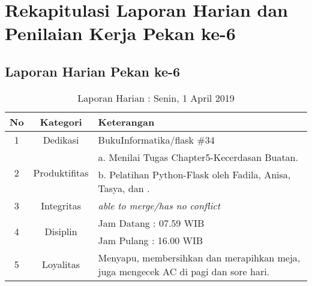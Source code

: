 \section{Rekapitulasi Laporan Harian dan Penilaian Kerja Pekan ke-6}

\subsection{Laporan Harian Pekan ke-6}

\begin{table}[htp]
\begin{center}
\caption{Laporan Harian : Senin, 1 April 2019}
\label{tab:lh010419}
\begin{tabularx}{\textwidth}{|l|l|X|}
\hline
\multicolumn{1}{|c|}{\textbf{No}} & \multicolumn{1}{c|}{\textbf{Kategori}} & \textbf{Keterangan} \\ \hline
\multicolumn{1}{|c|}{\multirow{1}{*}{1}} & \multicolumn{1}{c|}{\multirow{1}{*}{\parbox{2.5cm}{Dedikasi}}}
& BukuInformatika/flask \#34\\
\hline
\multicolumn{1}{|c|}{\multirow{2}{*}{2}} & \multicolumn{1}{c|}{\multirow{2}{*}{\parbox{2.5cm}{Produktifitas}}}
& a. Menilai Tugas Chapter5-Kecerdasan Buatan.\\
\multicolumn{1}{|c|}{\multirow{1}{*}{}} & \multicolumn{1}{c|}{\multirow{1}{*}{\parbox{2.5cm}{}}}
& b. Pelatihan Python-Flask oleh Fadila, Anisa, Tasya, dan .\\
\hline
\multicolumn{1}{|c|}{\multirow{1}{*}{3}} & \multicolumn{1}{c|}{\multirow{1}{*}{\parbox{2.5cm}{Integritas}}}
& \textit{able to merge/has no conflict} \\
\hline
\multicolumn{1}{|c|}{\multirow{2}{*}{4}} & \multicolumn{1}{c|}{\multirow{2}{*}{\parbox{2.5cm}{Disiplin}}}
& Jam Datang : 07.59 WIB \\
\multicolumn{1}{|c|}{\multirow{1}{*}{}} & \multicolumn{1}{c|}{\multirow{1}{*}{\parbox{2.5cm}{}}}
& Jam Pulang : 16.00 WIB \\
\hline
\multicolumn{1}{|c|}{\multirow{2}{*}{5}} & \multicolumn{1}{c|}{\multirow{2}{*}{\parbox{2.5cm}{Loyalitas}}}
& Menyapu, membersihkan dan merapihkan meja, juga mengecek AC di pagi dan sore hari.\\
\hline
\end{tabularx}
\end{center}
\end{table}

